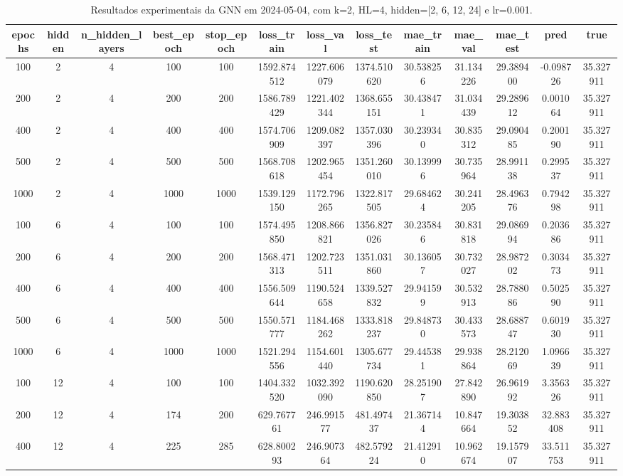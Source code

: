 \begin{table}[h]
\centering
\caption{Resultados experimentais da GNN em 2024-05-04, com k=2, HL=4, hidden=[2, 6, 12, 24] e lr=0.001.}
\label{tab:gnn_results_k2_hl4_d20240504}
\begin{tabular}{ccccccccccccc}
\toprule
epochs & hidden & n\_hidden\_layers & best\_epoch & stop\_epoch & loss\_train & loss\_val & loss\_test & mae\_train & mae\_val & mae\_test & pred & true \\
\midrule
100 & 2 & 4 & 100 & 100 & 1592.874512 & 1227.606079 & 1374.510620 & 30.538256 & 31.134226 & 29.389400 & -0.098726 & 35.327911 \\
200 & 2 & 4 & 200 & 200 & 1586.789429 & 1221.402344 & 1368.655151 & 30.438471 & 31.034439 & 29.289612 & 0.001064 & 35.327911 \\
400 & 2 & 4 & 400 & 400 & 1574.706909 & 1209.082397 & 1357.030396 & 30.239340 & 30.835312 & 29.090485 & 0.200190 & 35.327911 \\
500 & 2 & 4 & 500 & 500 & 1568.708618 & 1202.965454 & 1351.260010 & 30.139996 & 30.735964 & 28.991138 & 0.299537 & 35.327911 \\
1000 & 2 & 4 & 1000 & 1000 & 1539.129150 & 1172.796265 & 1322.817505 & 29.684624 & 30.241205 & 28.496376 & 0.794298 & 35.327911 \\
100 & 6 & 4 & 100 & 100 & 1574.495850 & 1208.866821 & 1356.827026 & 30.235846 & 30.831818 & 29.086994 & 0.203686 & 35.327911 \\
200 & 6 & 4 & 200 & 200 & 1568.471313 & 1202.723511 & 1351.031860 & 30.136057 & 30.732027 & 28.987202 & 0.303473 & 35.327911 \\
400 & 6 & 4 & 400 & 400 & 1556.509644 & 1190.524658 & 1339.527832 & 29.941599 & 30.532913 & 28.788086 & 0.502590 & 35.327911 \\
500 & 6 & 4 & 500 & 500 & 1550.571777 & 1184.468262 & 1333.818237 & 29.848730 & 30.433573 & 28.688747 & 0.601930 & 35.327911 \\
1000 & 6 & 4 & 1000 & 1000 & 1521.294556 & 1154.601440 & 1305.677734 & 29.445381 & 29.938864 & 28.212069 & 1.096639 & 35.327911 \\
100 & 12 & 4 & 100 & 100 & 1404.332520 & 1032.392090 & 1190.620850 & 28.251907 & 27.842890 & 26.961992 & 3.356326 & 35.327911 \\
200 & 12 & 4 & 174 & 200 & 629.767761 & 246.991577 & 481.497437 & 21.367144 & 10.847664 & 19.303852 & 32.883408 & 35.327911 \\
400 & 12 & 4 & 225 & 285 & 628.800293 & 246.907364 & 482.579224 & 21.412910 & 10.962674 & 19.157907 & 33.511753 & 35.327911 \\

\end{tabular}
\end{table}
